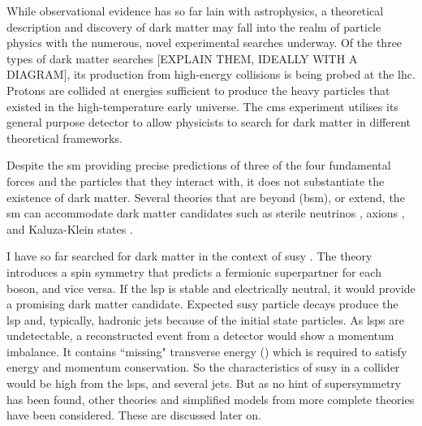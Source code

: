 
\iffalse

While observational evidence has so far lain with astrophysics, a theoretical description and discovery of dark matter may fall into the realm of particle physics with the numerous, novel experimental searches underway. Of the three types of dark matter searches [EXPLAIN THEM, IDEALLY WITH A DIAGRAM], its production from high-energy collisions is being probed at the \acrshort{lhc}. Protons are collided at energies sufficient to produce the heavy particles that existed in the high-temperature early universe. The \acrfull{cms} experiment utilises its general purpose detector to allow physicists to search for dark matter in different theoretical frameworks.

Despite the \acrlong{sm} providing precise predictions of three of the four fundamental forces and the particles that they interact with, it does not substantiate the existence of dark matter. Several theories that are beyond (\acrshort{bsm}), or extend, the \acrlong{sm} can accommodate dark matter candidates such as sterile neutrinos \cite{doi:10.1142/S0218301313300191}, axions \cite{1981PhLB..104..199D}, and Kaluza-Klein states \cite{Han:1998sg}.

I have so far searched for dark matter in the context of \acrfull{susy} \cite{Martin:1997ns}. The theory introduces a spin symmetry that predicts a fermionic superpartner for each boson, and vice versa. If the \acrfull{lsp} is stable and electrically neutral, it would provide a promising dark matter candidate. Expected \acrshort{susy} particle decays produce the \acrshort{lsp} and, typically, hadronic jets because of the initial state particles. As \glspl{lsp} are undetectable, a reconstructed event from a detector would show a momentum imbalance. It contains ``missing" transverse energy () which is required to satisfy energy and momentum conservation. So the characteristics of \acrshort{susy} in a collider would be high \etmiss from the \glspl{lsp}, and several jets. But as no hint of supersymmetry has been found, other theories and simplified models from more complete theories have been considered. These are discussed later on.

